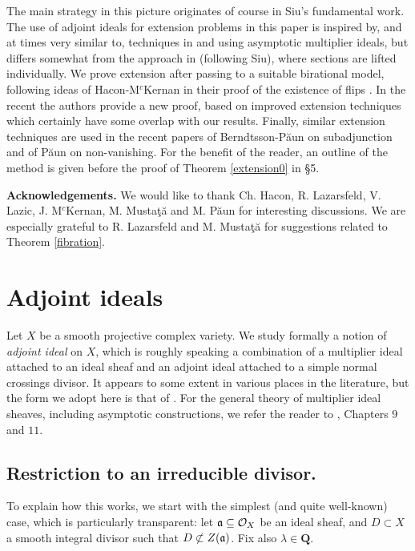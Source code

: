 \documentclass[11pt]{amsart}
\theoremstyle{plain}
\theoremstyle{definition}
\newcommand{\QQ}{\mathbf{Q}}
\newcommand{\OO}{\mathcal  {O}}
\newcommand{\fra}{\frak{a}}
\begin{document}
The main strategy in this picture originates of course in Siu's fundamental work. The use of adjoint ideals for extension problems in this paper is inspired by, and at times very similar to, techniques in \cite{kawamata} and \cite{hm1} using asymptotic multiplier ideals, but differs somewhat from the approach in \cite{takayama} (following Siu), where sections are lifted individually.
We prove extension after passing to a suitable birational model, following ideas of 
Hacon-M$^c$Kernan in their proof of the existence of flips \cite{hm2}. In the recent \cite{hm3} the authors provide a new proof, based on improved extension techniques which certainly have some overlap with our results. Finally, similar extension techniques are used in the recent papers
of Berndtsson-P\u aun \cite{bp} on subadjunction and of P\u aun \cite{paun2} on non-vanishing.
For the benefit of the reader, an outline of the method is given before the proof of Theorem 
\ref{extension0} in \S5.


\noindent
{\bf Acknowledgements.} 
We would like to thank Ch. Hacon, R. Lazarsfeld, V. Lazic, J. M$^c$Kernan, M. Musta\c t\u a and  M. P\u aun for interesting discussions. We are especially grateful to R. Lazarsfeld and M. Musta\c t\u a for suggestions related to Theorem \ref{fibration}.










\section{Adjoint ideals}

Let $X$ be a smooth projective complex variety. We study formally a notion of \emph{adjoint ideal} on $X$, which is roughly speaking a combination of a multiplier ideal attached to an ideal sheaf and an adjoint ideal attached to a simple normal crossings divisor. It  appears to some extent in various places in the literature, but the form we adopt here is that of \cite{hm1}. For the general theory of multiplier ideal sheaves, including asymptotic constructions, we refer the reader to \cite{positivity}, Chapters $9$
and $11$.

\subsection*{Restriction to an irreducible divisor.}
To explain how this works, we start with the simplest (and quite well-known) case, which is particularly transparent: let $\fra \subseteq \OO_X$ be an ideal sheaf, and $D \subset X$ a smooth integral divisor such that $D \not \subset Z(\fra)$. Fix also $\lambda \in \QQ$. 
\end{document}

